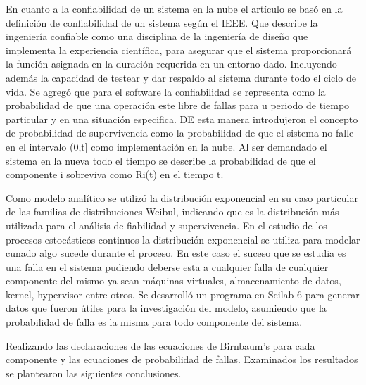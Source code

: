 En cuanto a la confiabilidad de un sistema en la nube el artículo se basó en la definición de confiabilidad de un sistema según el IEEE. Que describe la ingeniería confiable como una disciplina de la ingeniería de diseño que implementa la experiencia científica, para asegurar que el sistema proporcionará la función asignada en la duración requerida en un entorno dado. Incluyendo además la capacidad de testear y dar respaldo al sistema durante todo el ciclo de vida. Se agregó que para el software la confiabilidad se representa como la probabilidad de que una operación este libre de fallas para u periodo de tiempo particular y en una situación especifica.
DE esta manera introdujeron el concepto de probabilidad de supervivencia como la probabilidad de que el sistema no falle en el intervalo (0,t]  como implementación en la nube. Al ser demandado el sistema en la nueva todo el tiempo se describe la probabilidad de que el componente i sobreviva como Ri(t) en el tiempo t.


Como modelo analítico se utilizó la distribución exponencial en su caso particular de las familias de distribuciones Weibul, indicando que es la distribución más utilizada para el análisis de fiabilidad y supervivencia. En el estudio de los procesos estocásticos continuos la distribución exponencial se utiliza para modelar cunado algo sucede durante el proceso. En este caso el suceso que se estudia es una falla en el sistema pudiendo deberse esta a cualquier falla de cualquier componente del mismo ya sean máquinas virtuales, almacenamiento de datos, kernel, hypervisor entre otros.
Se desarrolló un programa en Scilab 6 para generar datos que fueron útiles para la investigación del modelo, asumiendo que la probabilidad de falla es la misma para todo componente del sistema.

Realizando las declaraciones de las ecuaciones de Birnbaum’s para cada componente y las ecuaciones de probabilidad de fallas. Examinados los resultados se plantearon las siguientes conclusiones. 

